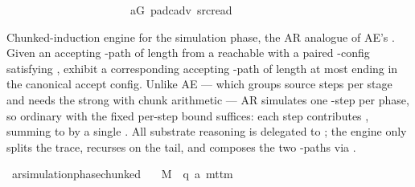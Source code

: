 \begin{isabellebody}
\ \ \ \ \ \ \ \ \ \ \ \ \ \ \ \ \ \ \ \ \ \ a{\isacharprime}{\kern0pt}G\ pad{\isacharunderscore}{\kern0pt}cadv\ src{\isacharunderscore}{\kern0pt}read{\isacharparenright}{\kern0pt}\isanewline
\ \ \ \ \isamarkupfalse%
\isanewline
\ \ \isamarkupfalse%
\isanewline
{}\isamarkupfalse%
%
\endisatagproof
{\isafoldproof}%
%
\isadelimproof
%
\endisadelimproof
%
\begin{isamarkuptext}%
Chunked-induction engine for the simulation phase, the
  AR analogue of AE's .  Given an
  accepting -path of length  from a reachable 
  with a paired  -config  satisfying
  , exhibit a corresponding accepting
  -path of length at most  ending in the
  canonical accept config.  Unlike AE — which groups  source
  steps per stage and needs the strong  with
   chunk arithmetic — AR simulates one -step per
  phase, so ordinary  with the fixed per-step
  bound suffices: each step contributes , summing to
   by a single .  All substrate
  reasoning is delegated to ; the
  engine only splits the trace, recurses on the tail, and composes
  the two -paths via .%
\end{isamarkuptext}\isamarkuptrue%
\isamarkupfalse%
\ ar{\isacharunderscore}{\kern0pt}simulation{\isacharunderscore}{\kern0pt}phase{\isacharunderscore}{\kern0pt}chunked{\isacharcolon}{\kern0pt}\isanewline
\ \ \ M\ {\isacharcolon}{\kern0pt}{\isacharcolon}{\kern0pt}\ {\isachardoublequoteopen}{\isacharparenleft}{\kern0pt}{\isacharprime}{\kern0pt}q{\isacharcomma}{\kern0pt}\ {\isacharprime}{\kern0pt}a{\isacharparenright}{\kern0pt}\ mttm{\isachardoublequoteclose}\isanewline

\end{isabellebody}

